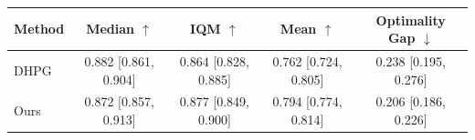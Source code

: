 \begin{tabular}{lcccc}
\toprule
Method & Median $\uparrow$ & IQM $\uparrow$ & Mean $\uparrow$ & Optimality Gap $\downarrow$ \\
\midrule
DHPG & 0.882 {\scriptsize [0.861, 0.904]} & 0.864 {\scriptsize [0.828, 0.885]} & 0.762 {\scriptsize [0.724, 0.805]} & 0.238 {\scriptsize [0.195, 0.276]} \\
Ours & 0.872 {\scriptsize [0.857, 0.913]} & 0.877 {\scriptsize [0.849, 0.900]} & 0.794 {\scriptsize [0.774, 0.814]} & 0.206 {\scriptsize [0.186, 0.226]} \\
\bottomrule
\end{tabular}
